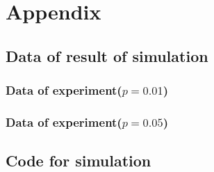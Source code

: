 \documentclass[runningheads]{llncs}
\begin{document}
\section*{Appendix}

\subsection*{Data of result of simulation}

\subsubsection*{Data of experiment($p=0.01$)}

\hfill\break
{}

\subsubsection*{Data of experiment($p=0.05$)}

\hfill\break
{}



\newpage
\subsection*{Code for simulation}


    
\end{document}
